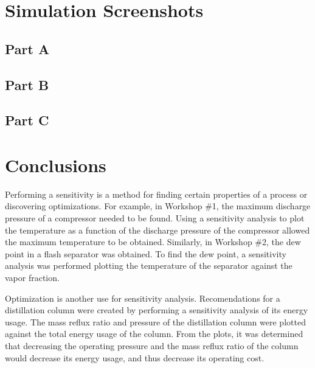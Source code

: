 \documentclass[12pt]{article}
\begin{document}
\section{Simulation Screenshots}

\subsection{Part A}

\subsection{Part B}

\subsection{Part C}

\section{Conclusions}

Performing a sensitivity is a method for finding certain properties of a process or discovering optimizations. For example, in Workshop \#1, the maximum discharge pressure of a compressor needed to be found. Using a sensitivity analysis to plot the temperature as a function of the discharge pressure of the compressor allowed the maximum temperature to be obtained. Similarly, in Workshop \#2, the dew point in a flash separator was obtained. To find the dew point, a sensitivity analysis was performed plotting the temperature of the separator against the vapor fraction.

Optimization is another use for sensitivity analysis. Recomendations for a distillation column were created by performing a sensitivity analysis of its energy usage. The mass reflux ratio and pressure of the distillation column were plotted against the total energy usage of the column. From the plots, it was determined that decreasing the operating pressure and the mass reflux ratio of the column would decrease its energy usage, and thus decrease its operating cost.
\end{document}
